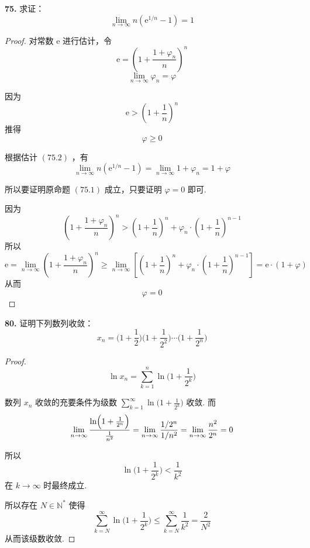 \textbf{75.} 求证：
\[\lim_{n \rightarrow \infty} n \left(\mathrm{e}^{1/n}-1\right) = 1 \tag{75.1}\]
\begin{proof}
    对常数 $\mathrm{e}$ 进行估计，令
    \[\mathrm{e} = \left(1 + \frac{1 + \varphi_n}{n}\right)^n \tag{75.2}\]
    \[\lim_{n \rightarrow \infty} \varphi_n = \varphi\]

    因为
    \[\mathrm{e} > \left(1 + \frac{1}{n}\right)^n\]
    推得
    \[\varphi \geqslant 0 \tag{72.3}\]
    
    根据估计 $(75.2)$ ，有
    \[\lim_{n \rightarrow \infty} n \left(\mathrm{e}^{1/n}-1\right) = \lim_{n \rightarrow \infty} 1 + \varphi_n = 1 + \varphi \tag{75.4}\]

    所以要证明原命题 $(75.1)$ 成立，只要证明 $\varphi = 0$ 即可.

    因为
    \[\left(1 + \frac{1 + \varphi_n}{n}\right)^n > \left(1 + \frac{1}{n}\right)^n + \varphi_n \cdot \left(1 + \frac{1}{n}\right)^{n-1}\]
    所以
    \[\mathrm{e} = \lim_{n \rightarrow \infty} \left(1 + \frac{1 + \varphi_n}{n}\right)^n \geqslant \lim_{n \rightarrow \infty} \left[\left(1 + \frac{1}{n}\right)^n + \varphi_n \cdot \left(1 + \frac{1}{n}\right)^{n-1}\right] = \mathrm{e} \cdot (1+\varphi) \tag{75.5}\]
    从而
    \[\varphi = 0 \tag{75.6}\]
\end{proof}\vspace{9pt}

\textbf{80.} 证明下列数列收敛：
\[x_n = \biggl(1 + \frac{1}{2}\biggr)\biggl(1 + \frac{1}{2^2}\biggr) \cdots \biggl(1 + \frac{1}{2^n}\biggr)\]
\begin{proof}
    \[\ln x_n = \sum_{k=1}^{n} \ln\biggl(1 + \frac{1}{2^k}\biggr)\]

    数列 $x_n$ 收敛的充要条件为级数 $\displaystyle \sum_{k=1}^{\infty} \ln\biggl(1 + \frac{1}{2^k}\biggr)$ 收敛. 而
    \[\lim_{n \rightarrow \infty} \frac{\ln\Bigl(1 + \frac{1}{2^n}\Bigr)}{\frac{1}{n^2}} = \lim_{n \rightarrow \infty} \frac{1/2^n}{1/n^2} = \lim_{n \rightarrow \infty} \frac{n^2}{2^n} = 0\]

    所以
    \[\ln \biggl(1 + \frac{1}{2^k}\biggr) < \frac{1}{k^2}\]
    在 $k \rightarrow \infty$ 时最终成立.

    所以存在 $N \in \mathbb{N}^*$ 使得
    \[\sum_{k=N}^{\infty} \ln \biggl(1 + \frac{1}{2^k}\biggr) \leqslant \sum_{k=N}^{\infty} \frac{1}{k^2} = \frac{2}{N^2}\]
    从而该级数收敛.
\end{proof}\vspace{9pt}

